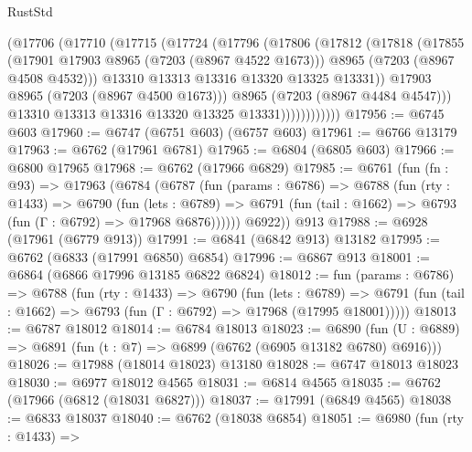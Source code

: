 \begin{lexlean}{RustStd}
\begin{coremodule}
                    (@17706
                      (@17710
                        (@17715
                          (@17724
                            (@17796
                              (@17806
                                (@17812
                                  (@17818
                                    (@17855
                                      (@17901 @17903 @8965 (@7203 (@8967 @4522 @1673)))
                                      @8965
                                      (@7203 (@8967 @4508 @4532)))
                                    @13310
                                    @13313
                                    @13316
                                    @13320
                                    @13325
                                    @13331))
                                @17903
                                @8965
                                (@7203 (@8967 @4500 @1673)))
                              @8965
                              (@7203 (@8967 @4484 @4547)))
                            @13310
                            @13313
                            @13316
                            @13320
                            @13325
                            @13331))))))))))))
@17956 := @6745 @603
@17960 := @6747 (@6751 @603) (@6757 @603)
@17961 := @6766 @13179
@17963 := @6762 (@17961 @6781)
@17965 := @6804 (@6805 @603)
@17966 := @6800 @17965
@17968 := @6762 (@17966 @6829)
@17985 := @6761
    (fun (fn : @93) =>
    @17963
      (@6784
        (@6787
          (fun (params : @6786) =>
          @6788
            (fun (rty : @1433) =>
            @6790
              (fun (lets : @6789) =>
              @6791 (fun (tail : @1662) => @6793 (fun (Γ : @6792) => @17968 @6876))))))
        @6922))
    @913
@17988 := @6928 (@17961 (@6779 @913))
@17991 := @6841 (@6842 @913) @13182
@17995 := @6762 (@6833 (@17991 @6850) @6854)
@17996 := @6867 @913
@18001 := @6864 (@6866 @17996 @13185 @6822 @6824)
@18012 := fun (params : @6786) =>
  @6788
    (fun (rty : @1433) =>
    @6790
      (fun (lets : @6789) =>
      @6791 (fun (tail : @1662) => @6793 (fun (Γ : @6792) => @17968 (@17995 @18001)))))
@18013 := @6787 @18012
@18014 := @6784 @18013
@18023 := @6890
    (fun (U : @6889) => @6891 (fun (t : @7) => @6899 (@6762 (@6905 @13182 @6780) @6916)))
@18026 := @17988 (@18014 @18023) @13180
@18028 := @6747 @18013 @18023
@18030 := @6977 @18012 @4565
@18031 := @6814 @4565
@18035 := @6762 (@17966 (@6812 (@18031 @6827)))
@18037 := @17991 (@6849 @4565)
@18038 := @6833 @18037
@18040 := @6762 (@18038 @6854)
@18051 := @6980
    (fun (rty : @1433) =>

\end{coremodule}
\end{lexlean}
